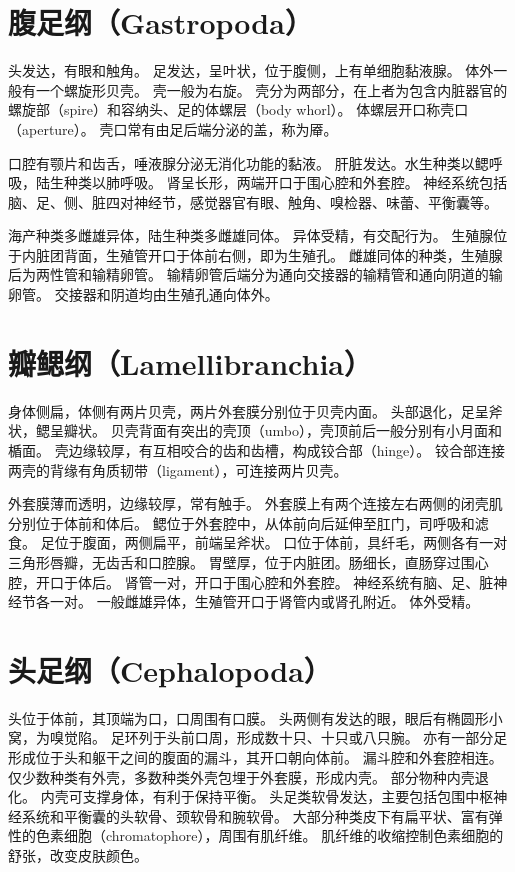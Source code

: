 \documentclass[11pt]{article}
\begin{document}
\section{腹足纲（Gastropoda）}
头发达，有眼和触角。
足发达，呈叶状，位于腹侧，上有单细胞黏液腺。
体外一般有一个螺旋形贝壳。
壳一般为右旋。
壳分为两部分，在上者为包含内脏器官的螺旋部（spire）和容纳头、足的体螺层（body whorl）。
体螺层开口称壳口（aperture）。
壳口常有由足后端分泌的盖，称为厣。

\newline

口腔有颚片和齿舌，唾液腺分泌无消化功能的黏液。
肝脏发达。水生种类以鳃呼吸，陆生种类以肺呼吸。
肾呈长形，两端开口于围心腔和外套腔。
神经系统包括脑、足、侧、脏四对神经节，感觉器官有眼、触角、嗅检器、味蕾、平衡囊等。

\newline

海产种类多雌雄异体，陆生种类多雌雄同体。
异体受精，有交配行为。
生殖腺位于内脏团背面，生殖管开口于体前右侧，即为生殖孔。
雌雄同体的种类，生殖腺后为两性管和输精卵管。
输精卵管后端分为通向交接器的输精管和通向阴道的输卵管。
交接器和阴道均由生殖孔通向体外。
  
\section{瓣鳃纲（Lamellibranchia）}
身体侧扁，体侧有两片贝壳，两片外套膜分别位于贝壳内面。
头部退化，足呈斧状，鳃呈瓣状。
贝壳背面有突出的壳顶（umbo），壳顶前后一般分别有小月面和楯面。
壳边缘较厚，有互相咬合的齿和齿槽，构成铰合部（hinge）。
铰合部连接两壳的背缘有角质韧带（ligament），可连接两片贝壳。

\newline

外套膜薄而透明，边缘较厚，常有触手。
外套膜上有两个连接左右两侧的闭壳肌分别位于体前和体后。
鳃位于外套腔中，从体前向后延伸至肛门，司呼吸和滤食。
足位于腹面，两侧扁平，前端呈斧状。
口位于体前，具纤毛，两侧各有一对三角形唇瓣，无齿舌和口腔腺。
胃壁厚，位于内脏团。肠细长，直肠穿过围心腔，开口于体后。
肾管一对，开口于围心腔和外套腔。
神经系统有脑、足、脏神经节各一对。
一般雌雄异体，生殖管开口于肾管内或肾孔附近。
体外受精。
  
\section{头足纲（Cephalopoda）}
头位于体前，其顶端为口，口周围有口膜。
头两侧有发达的眼，眼后有椭圆形小窝，为嗅觉陷。
足环列于头前口周，形成数十只、十只或八只腕。
亦有一部分足形成位于头和躯干之间的腹面的漏斗，其开口朝向体前。
漏斗腔和外套腔相连。
仅少数种类有外壳，多数种类外壳包埋于外套膜，形成内壳。
部分物种内壳退化。
内壳可支撑身体，有利于保持平衡。
头足类软骨发达，主要包括包围中枢神经系统和平衡囊的头软骨、颈软骨和腕软骨。
大部分种类皮下有扁平状、富有弹性的色素细胞（chromatophore），周围有肌纤维。
肌纤维的收缩控制色素细胞的舒张，改变皮肤颜色。
\end{document}
